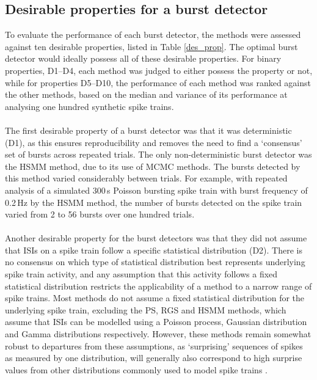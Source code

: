 \documentclass[12pt, titlepage]{article}
\begin{document}
	\subsection*{Desirable properties for a burst detector}
	To evaluate the performance of each burst detector, the methods were assessed against ten desirable properties, listed in Table \ref{des_prop}. The optimal burst detector would ideally possess all of these desirable properties. For binary properties, D1--D4, each method was judged to either possess the property or not, while for properties D5--D10, the performance of each method was ranked against the other methods, based on the median and variance of its performance at analysing one hundred synthetic spike trains. 
	\\ \\ The first desirable property of a burst detector was that it was deterministic (D1), as this ensures reproducibility and removes the need to find a `consensus' set of bursts across repeated trials. The only non-deterministic burst detector was the HSMM method, due to its use of MCMC methods. The bursts detected by this method varied considerably between trials. For example, with repeated analysis of a simulated $300\,$s Poisson bursting spike train with burst frequency of 0.2$\,$Hz by the HSMM method, the number of bursts detected on the spike train varied from 2 to 56 bursts over one hundred trials. 
	\\ \\ Another desirable property for the burst detectors was that they did not assume that ISIs on a spike train follow a specific statistical distribution (D2). There is no consensus on which type of statistical distribution best represents underlying spike train activity, and any assumption that this activity follows a fixed statistical distribution restricts the applicability of a method to a narrow range of spike trains. Most methods do not assume a fixed statistical distribution for the underlying spike train, excluding the PS, RGS and HSMM methods, which assume that ISIs can be modelled using a Poisson process, Gaussian distribution and Gamma distributions respectively. However, these methods remain somewhat robust to departures from these assumptions, as `surprising' sequences of spikes as measured by one distribution, will generally also correspond to high surprise values from other distributions commonly used to model spike trains \cite{Legendy1985}. 
\end{document}
